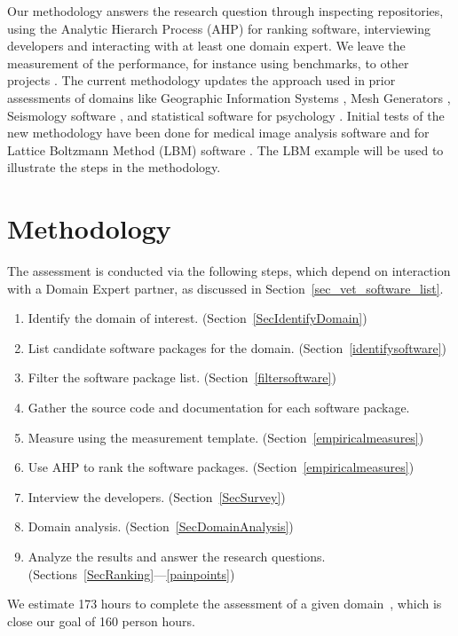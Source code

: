 \documentclass[runningheads]{llncs}
\begin{document}
Our methodology answers the research question through inspecting repositories,
using the Analytic Hierarch Process (AHP) for ranking software, interviewing
developers and interacting with at least one domain expert.  We leave the
measurement of the performance, for instance using benchmarks, to other projects
\cite{KaagstromEtAl1998}. The current methodology updates the approach used in
prior assessments of domains like Geographic Information Systems
\cite{SmithEtAl2018_arXivGIS}, Mesh Generators \cite{SmithEtAl2016}, Seismology
software \cite{SmithEtAl2018}, and statistical software for psychology
\cite{SmithEtAl2018_StatSoft}.  Initial tests of the new methodology have been
done for medical image analysis software \cite{Dong2021} and for Lattice
Boltzmann Method (LBM) software \cite{Michalski2021}.  The LBM example will be
used to illustrate the steps in the methodology.

\section{Methodology} \label{methodology}

The assessment is conducted via the following steps, which depend on
interaction with a Domain Expert partner, as discussed in
Section~\ref{sec_vet_software_list}.

\begin{enumerate}
  \item Identify the domain of interest. (Section~\ref{SecIdentifyDomain})
	\item List candidate software packages for the domain.
	(Section~\ref{identifysoftware})
	\item Filter the software package list. (Section~\ref{filtersoftware})
	\item Gather the source code and documentation for each software package.
	\item Measure using the measurement template. (Section~\ref{empiricalmeasures})
	\item Use AHP to rank the software packages. (Section~\ref{empiricalmeasures})
	\item Interview the developers. (Section~\ref{SecSurvey})
    \item Domain analysis. (Section~\ref{SecDomainAnalysis})
	\item Analyze the results and answer the research questions.
	(Sections~\ref{SecRanking}---\ref{painpoints})
\end{enumerate}

We estimate 173 hours to complete the assessment of a given
domain~\cite{SmithEtAl2021}, which is close our goal of 160 person hours.
\end{document}

